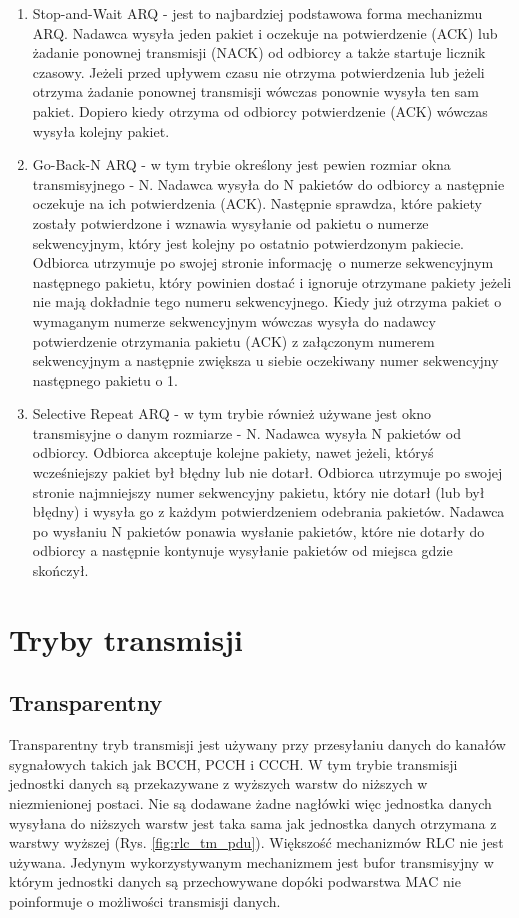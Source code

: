 \begin{enumerate}
	\item Stop-and-Wait ARQ - jest to najbardziej podstawowa forma mechanizmu ARQ. Nadawca wysyła jeden pakiet i oczekuje na potwierdzenie (ACK) lub żadanie ponownej transmisji (NACK) od odbiorcy a także startuje licznik czasowy. Jeżeli przed upływem czasu nie otrzyma potwierdzenia lub jeżeli otrzyma żadanie ponownej transmisji wówczas ponownie wysyła ten sam pakiet. Dopiero kiedy otrzyma od odbiorcy potwierdzenie (ACK) wówczas wysyła kolejny pakiet.
	\item Go-Back-N ARQ - w tym trybie określony jest pewien rozmiar okna transmisyjnego - N. Nadawca wysyła do N pakietów do odbiorcy a następnie oczekuje na ich potwierdzenia (ACK). Następnie sprawdza, które pakiety zostały potwierdzone i wznawia wysyłanie od pakietu o numerze sekwencyjnym, który jest kolejny po ostatnio potwierdzonym pakiecie. Odbiorca utrzymuje po swojej stronie informację o numerze sekwencyjnym następnego pakietu, który powinien dostać i ignoruje otrzymane pakiety jeżeli nie mają dokładnie tego numeru sekwencyjnego. Kiedy już otrzyma pakiet o wymaganym numerze sekwencyjnym wówczas wysyła do nadawcy potwierdzenie otrzymania pakietu (ACK) z załączonym numerem sekwencyjnym a następnie zwiększa u siebie oczekiwany numer sekwencyjny następnego pakietu o 1.
	\item Selective Repeat ARQ - w tym trybie również używane jest okno transmisyjne o danym rozmiarze - N. Nadawca wysyła N pakietów od odbiorcy. Odbiorca akceptuje kolejne pakiety, nawet jeżeli, któryś wcześniejszy pakiet był błędny lub nie dotarł. Odbiorca utrzymuje po swojej stronie najmniejszy numer sekwencyjny pakietu, który nie dotarł (lub był błędny) i wysyła go z każdym potwierdzeniem odebrania pakietów. Nadawca po wysłaniu N pakietów ponawia wysłanie pakietów, które nie dotarły do odbiorcy a następnie kontynuje wysyłanie pakietów od miejsca gdzie skończył.
\end{enumerate}

\section{Tryby transmisji}

\subsection{Transparentny}

Transparentny tryb transmisji jest używany przy przesyłaniu danych do kanałów sygnałowych takich jak BCCH, PCCH i CCCH. W tym trybie transmisji jednostki danych są przekazywane z wyższych warstw do niższych w niezmienionej postaci. Nie są dodawane żadne nagłówki więc jednostka danych wysyłana do niższych warstw jest taka sama jak jednostka danych otrzymana z warstwy wyższej (Rys. \ref{fig:rlc_tm_pdu}). Większość mechanizmów RLC nie jest używana. Jedynym wykorzystywanym mechanizmem jest bufor transmisyjny w którym jednostki danych są przechowywane dopóki podwarstwa MAC nie poinformuje o możliwości transmisji danych.

